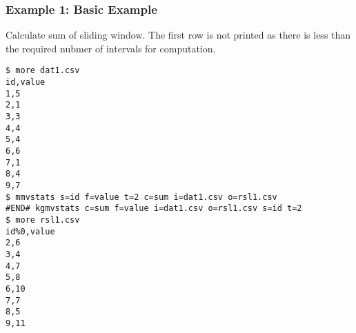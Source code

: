 \subsubsection*{Example 1: Basic Example}

Calculate sum of sliding window.
The first row is not printed as there is less than the required nubmer of intervals for computation.


\begin{Verbatim}[baselinestretch=0.7,frame=single]
$ more dat1.csv
id,value
1,5
2,1
3,3
4,4
5,4
6,6
7,1
8,4
9,7
$ mmvstats s=id f=value t=2 c=sum i=dat1.csv o=rsl1.csv
#END# kgmvstats c=sum f=value i=dat1.csv o=rsl1.csv s=id t=2
$ more rsl1.csv
id%0,value
2,6
3,4
4,7
5,8
6,10
7,7
8,5
9,11
\end{Verbatim}
